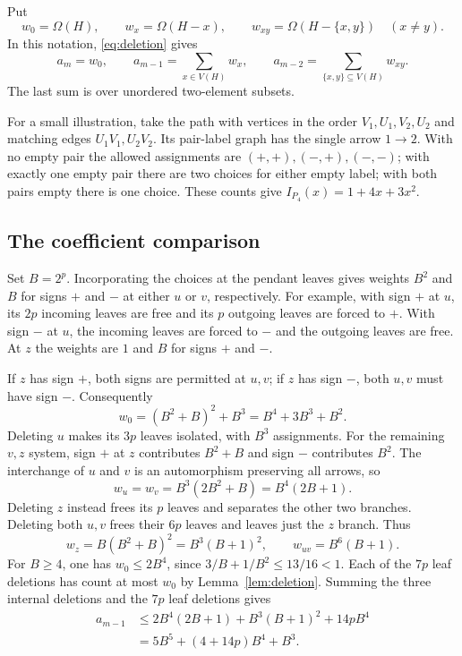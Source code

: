 \documentclass[11pt,a4paper]{article}
\theoremstyle{remark}
\numberwithin{equation}{section}
\begin{document}
Put
\[
 w_0=\Omega(H),\qquad w_x=\Omega(H-x),\qquad
 w_{xy}=\Omega(H-\{x,y\})\quad(x\ne y).
\]
In this notation, \eqref{eq:deletion} gives
\begin{equation}
 a_m=w_0,\qquad
 a_{m-1}=\sum_{x\in V(H)}w_x,\qquad
 a_{m-2}=\sum_{\{x,y\}\subseteq V(H)}w_{xy}.
 \label{eq:topthree}
\end{equation}
The last sum is over unordered two-element subsets.


For a small illustration, take the path with vertices in the order
$V_1,U_1,V_2,U_2$ and matching edges $U_1V_1,U_2V_2$.
Its pair-label graph has the single arrow $1\to2$.
With no empty pair the allowed assignments are $(+,+),(-,+),(-,-)$;
with exactly one empty pair there are two choices for either empty
label; with both pairs empty there is one choice. These counts give
$I_{P_4}(x)=1+4x+3x^2$.

\subsection{The coefficient comparison}\label{sec:comparison}

Set $B=2^p$. Incorporating the choices at the pendant leaves gives
weights $B^2$ and $B$ for signs $+$ and $-$ at either $u$ or $v$,
respectively. For example, with sign $+$ at $u$, its $2p$ incoming
leaves are free and its $p$ outgoing leaves are forced to $+$.
With sign $-$ at $u$, the incoming leaves are forced to $-$ and the
outgoing leaves are free. At $z$ the weights are $1$ and $B$ for
signs $+$ and $-$.

If $z$ has sign $+$, both signs are permitted at $u,v$; if $z$ has
sign $-$, both $u,v$ must have sign $-$. Consequently
\begin{equation}
 w_0=(B^2+B)^2+B^3=B^4+3B^3+B^2.
 \label{eq:wzero}
\end{equation}
Deleting $u$ makes its $3p$ leaves isolated, with $B^3$ assignments.
For the remaining $v,z$ system, sign $+$ at $z$ contributes $B^2+B$
and sign $-$ contributes $B^2$. The interchange of $u$ and $v$ is
an automorphism preserving all arrows, so
\begin{equation}
 w_u=w_v=B^3(2B^2+B)=B^4(2B+1).
 \label{eq:wu}
\end{equation}
Deleting $z$ instead frees its $p$ leaves and separates the other two
branches. Deleting both $u,v$ frees their $6p$ leaves and leaves just
the $z$ branch. Thus
\begin{equation}
 w_z=B(B^2+B)^2=B^3(B+1)^2,\qquad
 w_{uv}=B^6(B+1).
 \label{eq:wzuv}
\end{equation}
For $B\geq4$, one has $w_0\leq2B^4$, since
$3/B+1/B^2\leq13/16<1$. Each of the $7p$ leaf deletions has count
at most $w_0$ by Lemma~\ref{lem:deletion}. Summing the three internal
deletions and the $7p$ leaf deletions gives
\begin{equation}
\begin{aligned}
 a_{m-1}
 &\leq 2B^4(2B+1)+B^3(B+1)^2+14pB^4\\
 &=5B^5+(4+14p)B^4+B^3.
\end{aligned}
\label{eq:upper}
\end{equation}
\end{document}

